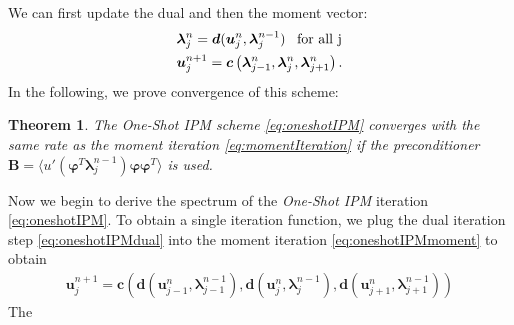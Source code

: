 \documentclass[10pt, a4paper, titlepage, bibliography=totocnumbered]{article}
\newtheorem{theorem}{Theorem}[section]
\newenvironment{proof}[1][Proof]{\begin{trivlist}
\item[\hskip \labelsep {\bfseries #1}]}{\end{trivlist}}
\begin{document}
We can first update the dual and then the moment vector:
\begin{subequations}\label{eq:oneshotIPMvv}
\begin{align}
&\bm{\lambda}_{j}^{n} =  \bm{d}(\bm{u}_j^{n},\bm{\lambda}_j^{n-1}) \enskip \text{ for all j} \label{eq:oneshotIPMdualvv}\\
&\bm{u}_j^{n+1} =  \bm{c}\left(\bm{\lambda}_{j-1}^n,\bm{\lambda}_{j}^n,\bm{\lambda}_{j+1}^n\right)\label{eq:oneshotIPMmomentvv}.
\end{align}
\end{subequations}
In the following, we prove convergence of this scheme:
\begin{theorem}
The \textit{One-Shot IPM} scheme \eqref{eq:oneshotIPM} converges with the same rate as the moment iteration \eqref{eq:momentIteration} if the preconditioner $\bm{B} = \langle u'(\bm{\varphi}^T\bm{\lambda}_j^{n-1})\bm{\varphi}\bm{\varphi}^T\rangle$ is used.
\end{theorem}
\begin{proof}
Now we begin to derive the spectrum of the \textit{One-Shot IPM} iteration \eqref{eq:oneshotIPM}. To obtain a single iteration function, we plug the dual iteration step \eqref{eq:oneshotIPMdual} into the moment iteration \eqref{eq:oneshotIPMmoment} to obtain
\begin{align*}
\bm{u}_j^{n+1} =  \bm{c}\left(\bm{d}(\bm{u}_{j-1}^{n},\bm{\lambda}_{j-1}^{n-1}),\bm{d}(\bm{u}_{j}^{n},\bm{\lambda}_{j}^{n-1}),\bm{d}(\bm{u}_{j+1}^{n},\bm{\lambda}_{j+1}^{n-1})\right)
\end{align*}
The 
\end{proof}
\end{document}
